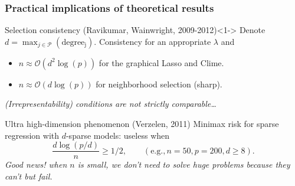 \begin{frame}
  \frametitle{Practical implications of theoretical results}

  \begin{block}{Selection    consistency    (Ravikumar,    Wainwright,
      2009-2012)}<1->                                           Denote
    $d=\max_{j\in\mathcal{P}}(\mathrm{degree_j})$.  Consistency for an
    appropriate $\lambda$ and
    \begin{itemize}
    \item  $n\approx\mathcal{O}(d^2\log(p))$ for  the graphical  Lasso
      and Clime.
    \item $n\approx\mathcal{O}(d\log(p))$  for   neighborhood
      selection (sharp).
    \end{itemize}
    \textit{(Irrepresentability) conditions are not strictly
    comparable\dots}
  \end{block}

  \vfill

  \begin{block}{Ultra high-dimension phenomenon (Verzelen,  2011)}
    Minimax risk for sparse regression with $d$-sparse models: useless
    when
    \begin{equation*}
    \frac{d \log(p/d)}{n} \geq 1/2, \qquad (\mathrm{e.g.}, n=50, p=200, d\geq 8).
    \end{equation*}
    \textit{Good news! when $n$ is small, we don't need to solve
      huge problems because they can't but fail.}
  \end{block}

\end{frame}

